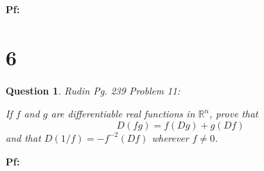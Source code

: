 \documentclass{article}
\newtheorem{question}{Question}
\begin{document}
\textbf{Pf:}

\break

\section*{6}
\begin{myBox}[]{}
    \begin{question}
        Rudin Pg. 239 Problem 11:

        If $f$ and $g$ are differentiable real functions in $\mathbb{R}^n$, prove that 
        $$D(fg)=f(Dg)+g(Df)$$
        and that $D(1/f)=-f^{-2}(Df)$ wherever $f\neq 0$.
    \end{question}
\end{myBox}

\textbf{Pf:}
\end{document}

